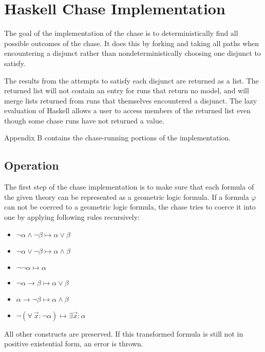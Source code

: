 \section{Haskell Chase Implementation}

	The goal of the implementation of the chase is to deterministically find
	all possible outcomes of the chase. It does this by forking and taking all
	paths when encountering a disjunct rather than nondeterministically
	choosing one disjunct to satisfy.

	The results from the attempts to satisfy each disjunct are returned as a
	list. The returned list will not contain an entry for runs that return no
	model, and will merge lists returned from runs that themselves encountered
	a disjunct. The lazy evaluation of Haskell allows a user to access members
	of the returned list even though some chase runs have not returned a value.

	Appendix B contains the chase-running portions of the implementation.

	\subsection{Operation}

	The first step of the chase implementation is to make sure that each
	formula of the given theory can be represented as a geometric logic
	formula. If a formula $\varphi$ can not be coerced to a geometric logic
	formula, the chase tries to coerce it into one by applying following rules
	recursively:

	\begin{itemize}
	\item $\neg\alpha \wedge \neg\beta \mapsto \alpha \vee \beta$
	\item $\neg\alpha \vee \neg\beta \mapsto \alpha \wedge \beta$
	\item $\neg\neg\alpha \mapsto \alpha$
	\item $\neg\alpha \to \beta \mapsto \alpha \vee \beta$
	\item $\alpha \to \neg\beta \mapsto \alpha \wedge \beta$
	\item $\neg(\forall\ \vec{x} : \neg\alpha) \mapsto \exists \vec{x} : \alpha$
	\end{itemize}

	All other constructs are preserved. If this transformed formula is still
	not in positive existential form, an error is thrown.

